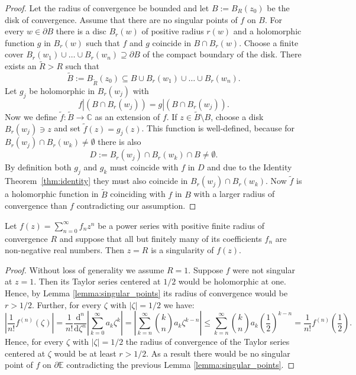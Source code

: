 \begin{proof}
  Let the radius of convergence be bounded and let $B := B_R(z_0)$ be the disk of convergence.
  Assume that there are no singular points of $f$ on $B$.
  For every $w \in \partial B$ there is a disc $B_r(w)$ of positive radius $r(w)$ and a holomorphic function $g$ in $B_r(w)$ such that $f$ and $g$ coincide in $B \cap B_r(w)$.
  Choose a finite cover $B_r(w_1) \cup \dots \cup B_r(w_n) \supseteq \partial B$ of the compact boundary of the disk.
  There exists an $\tilde{R} > R$ such that 
  $$
    \tilde{B} := B_{\tilde{R}}(z_0) \subseteq B \cup B_r(w_1) \cup \dots \cup B_r(w_n).
  $$
  Let $g_j$ be holomorphic in $B_r(w_j)$ with 
  $$
    f|(B \cap B_r(w_j)) = g|(B \cap B_r(w_j)).
  $$
  Now we define $\tilde{f}\colon \tilde{B} \to \mathbb{C}$ as an extension of $f$.
  If $z \in \tilde{B} \setminus B$, choose a disk $B_r(w_j) \ni z$ and set $\tilde{f}(z) = g_j(z)$.
  This function is well-defined, because for $B_r(w_j) \cap B_r(w_k) \neq \emptyset$ there is also 
  $$
    D := B_r(w_j) \cap B_r(w_k) \cap B  \neq \emptyset.
  $$
  By definition both $g_j$ and $g_k$ must coincide with $f$ in $D$ and due to the Identity Theorem~\ref{thm:identity} they must also coincide in $B_r(w_j) \cap B_r(w_k)$.
  Now $\tilde{f}$ is a holomorphic function in $\tilde{B}$ coinciding with $f$ in $B$ with a larger radius of convergence than $f$ contradicting our assumption.
\end{proof}

\begin{theorem}
  Let $f(z) = \sum_{n = 0}^\infty f_nz^n$ be a power series with positive finite radius of convergence $R$ and suppose that all but finitely many of its coefficients $f_n$ are non-negative real numbers. Then $z = R$ is a singularity of $f(z)$.
\end{theorem}

\begin{proof}
  Without loss of generality we assume $R = 1$.
  Suppose $f$ were not singular at $z = 1$.
  Then its Taylor series centered at $1/2$ would be holomorphic at one.
  Hence, by Lemma \ref{lemma:singular_points} its radius of convergence would be $r > 1/2$.
  Further, for every $\zeta$ with $|\zeta| = 1/2$ we have: 
  $$ 
    \left| 
      \frac{1}{n!}f^{(n)}(\zeta)
    \right| = 
    \frac{1}{n!} \frac{\mathrm{d}^n}{\mathrm{d}\zeta^n}
    \left|
      \sum_{k = 0}^\infty a_k\zeta^k
    \right| = 
    \left|
      \sum_{k = n}^\infty \binom{k}{n}a_k\zeta^{k - n}
    \right| \leq 
    \sum_{k = n}^\infty \binom{k}{n}a_{k}
    \left(\frac{1}{2}\right)^{k - n} = 
    \frac{1}{n!}f^{(n)}
    \left(\frac{1}{2}\right). 
  $$
  Hence, for every $\zeta$ with $|\zeta| = 1/2$ the radius of convergence of the Taylor series centered at $\zeta$ would be at least $r > 1/2$.
  As a result there would be no singular point of $f$ on $\partial \mathbb{E}$ contradicting the previous Lemma \ref{lemma:singular_points}.
\end{proof}